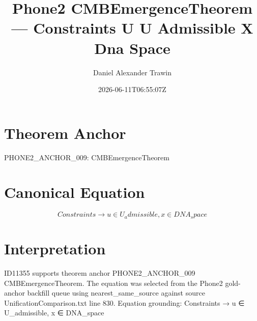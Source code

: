 \documentclass[11pt]{article}
\title{Phone2 CMBEmergenceTheorem — Constraints U U Admissible X Dna Space}
\author{Daniel Alexander Trawin}
\date{2026-06-11T06:55:07Z}
\begin{document}
\maketitle
\section*{Theorem Anchor}
PHONE2_ANCHOR_009: CMBEmergenceTheorem
\section*{Canonical Equation}
\[
Constraints → {u ∈ U_admissible, x ∈ DNA_space}
\]
\section*{Interpretation}
ID11355 supports theorem anchor PHONE2_ANCHOR_009 CMBEmergenceTheorem. The equation was selected from the Phone2 gold-anchor backfill queue using nearest_same_source against source UnificationComparison.txt line 830. Equation grounding: Constraints → {u ∈ U_admissible, x ∈ DNA_space}
\end{document}
